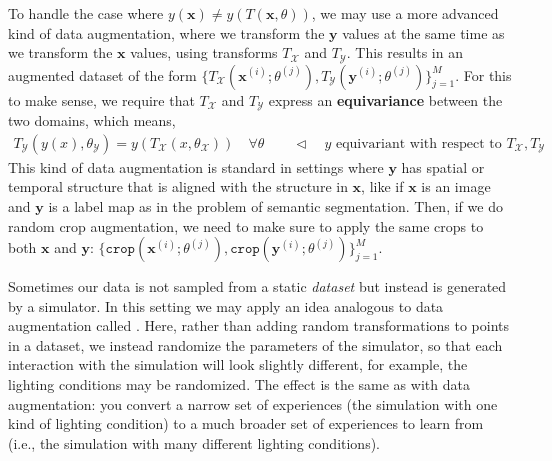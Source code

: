 To handle the case where $y(\mathbf{x}) \neq y(T(\mathbf{x},\theta))$, we may use a more advanced kind of data augmentation, where we transform the $\mathbf{y}$ values at the same time as we transform the $\mathbf{x}$ values, using transforms $T_{\mathcal{X}}$ and $T_{\mathcal{Y}}$. This results in an augmented dataset of the form $\{T_{\mathcal{X}}(\mathbf{x}^{(i)};\theta^{(j)}), T_{\mathcal{Y}}(\mathbf{y}^{(i)};\theta^{(j)})\}_{j=1}^M$. For this to make sense, we require that $T_{\mathcal{X}}$ and $T_{\mathcal{Y}}$ express an \textbf{equivariance} between the two domains, which means,
\begin{align}
     T_{\mathcal{Y}}(y(x),\theta_{\mathcal{Y}}) = y(T_{\mathcal{X}}(x,\theta_{\mathcal{X}})) \quad \forall \theta \quad\quad \triangleleft \quad\text{$y$ equivariant with respect to $T_\mathcal{X}, T_\mathcal{Y}$}
\end{align}
This kind of data augmentation is standard in settings where $\mathbf{y}$ has spatial or temporal structure that is aligned with the structure in $\mathbf{x}$, like if $\mathbf{x}$ is an image and $\mathbf{y}$ is a label map as in the problem of semantic segmentation. Then, if we do random crop augmentation, we need to make sure to apply the same crops to both $\mathbf{x}$ and $\mathbf{y}$: $\{\texttt{crop}(\mathbf{x}^{(i)};\theta^{(j)}), \texttt{crop}(\mathbf{y}^{(i)};\theta^{(j)})\}_{j=1}^M$.

Sometimes our data is not sampled from a static \textit{dataset} but instead is generated by a simulator. In this setting we may apply an idea analogous to data augmentation called . Here, rather than adding random transformations to points in a dataset, we instead randomize the parameters of the simulator, so that each interaction with the simulation will look slightly different, for example, the lighting conditions may be randomized. The effect is the same as with data augmentation: you convert a narrow set of experiences (the simulation with one kind of lighting condition) to a much broader set of experiences to learn from (i.e., the simulation with many different lighting conditions).


